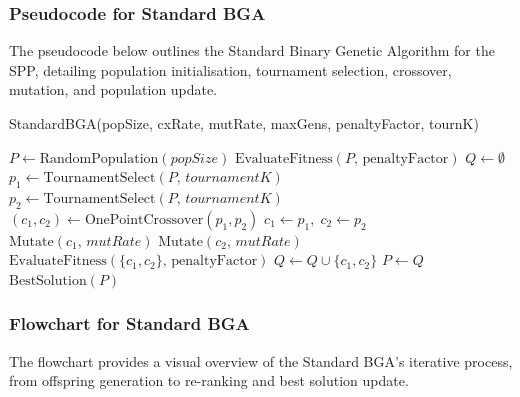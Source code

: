 \documentclass[12pt]{article}
\begin{document}
\subsubsection{Pseudocode for Standard BGA}
The pseudocode below outlines the Standard Binary Genetic Algorithm for the SPP, detailing population initialisation, tournament selection, crossover, mutation, and population update.
\begin{algorithm}[htbp]
  \caption{StandardBGA(popSize, cxRate, mutRate, maxGens, penaltyFactor, tournK)}
  \begin{algorithmic}[1]
    \State \(P \gets \text{RandomPopulation}(popSize)\) 
    \State \(\text{EvaluateFitness}(P,\,\text{penaltyFactor})\) 
      \State \(Q \gets \emptyset\) 
        \State \(p_1 \gets \text{TournamentSelect}(P,\, tournamentK)\) 
        \State \(p_2 \gets \text{TournamentSelect}(P,\, tournamentK)\) 
          \State \((c_1, c_2) \gets \text{OnePointCrossover}(p_1, p_2)\) 
        \Else
          \State \(c_1 \gets p_1,\; c_2 \gets p_2\) 
        \EndIf
        \State \(\text{Mutate}(c_1,\, mutRate)\) 
        \State \(\text{Mutate}(c_2,\, mutRate)\) 
        \State \(\text{EvaluateFitness}(\{c_1, c_2\},\, \text{penaltyFactor})\) 
        \State \(Q \gets Q \cup \{c_1, c_2\}\) 
      \EndWhile
      \State \(P \gets Q\) 
    \EndFor
    \State \Return \(\text{BestSolution}(P)\) 
  \end{algorithmic}
  \end{algorithm}

\subsubsection{Flowchart for Standard BGA}
The flowchart provides a visual overview of the Standard BGA’s iterative process, from offspring generation to re-ranking and best solution update.
\end{document}
